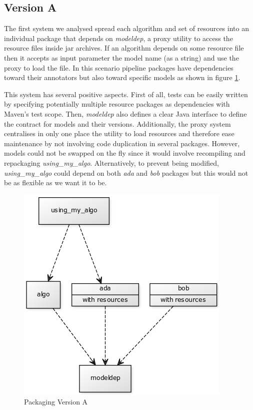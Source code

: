 \documentclass{article}
\newcommand{\id}[1]{\mbox{\textit{#1}}}
\begin{document}
\subsection{Version A}

The first system we analysed spread each algorithm and set of resources into an individual package that depends on \id{modeldep}, a proxy utility to access the resource files inside jar archives. If an algorithm depends on some resource file then it accepts as input parameter the model name (as a string) and use the proxy to load the file. In this scenario pipeline packages have dependencies toward their annotators but also toward specific models as shown in figure \ref{fig:pkgsysA}.

This system has several positive aspects. First of all, tests can be easily written by specifying potentially multiple resource packages as dependencies with Maven's test scope. Then, \id{modeldep} also defines a clear Java interface to define the contract for models and their versions. Additionally, the proxy system centralises in only one place the utility to load resources and therefore ease maintenance by not involving code duplication in several packages. However, models could not be swapped on the fly since it would involve recompiling and repackaging \id{using\_my\_algo}.  Alternatively, to prevent being modified, \id{using\_my\_algo} could depend on both \id{ada} and \id{bob} packages but this would not be as flexible as we want it to be.

\begin{figure}
\centering
\includegraphics{res/packaging_version_A.png}
\caption{Packaging Version A}
\label{fig:pkgsysA}
\end{figure}
\end{document}
